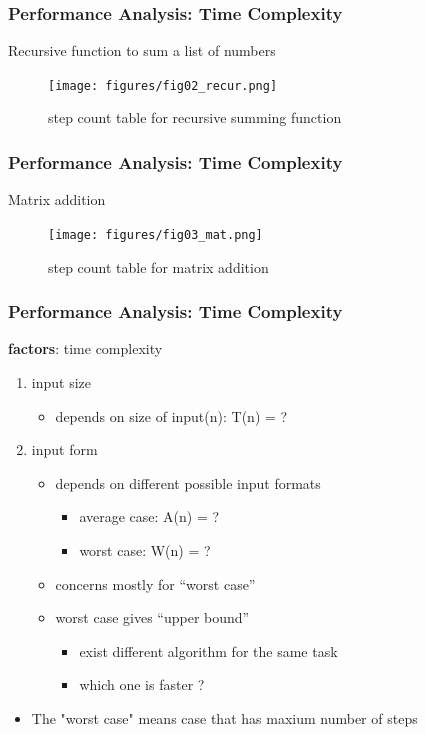 \documentclass[newPxFont,sthlmFooter,nooffset]{beamer}
\begin{document}
\begin{frame}[t]
  \frametitle{Performance Analysis: Time Complexity}
Recursive function to sum a list of numbers
  \begin{figure}[h]
    \centering
    \texttt{[image: figures/fig02\_recur.png]}
    \caption{step count table for recursive summing function}
  \end{figure}
\end{frame}

\begin{frame}[t]
  \frametitle{Performance Analysis: Time Complexity}
Matrix addition
  \begin{figure}[h]
    \centering
    \texttt{[image: figures/fig03\_mat.png]}
    \caption{step count table for matrix addition}
  \end{figure}
\end{frame}


\begin{frame}[t]
  \frametitle{Performance Analysis: Time Complexity}
\textbf{factors}: time complexity 
\begin{enumerate}
\item input size
  \begin{itemize}
  \item depends on size of input(n): T(n) = ?
  \end{itemize}

\item input form
  \begin{itemize}
  \item depends on different possible input formats
    \begin{itemize}
    \item average case: A(n) = ?
    \item worst case: W(n) = ?
    \end{itemize}

  \item concerns mostly for ``worst case''
  \item worst case gives ``upper bound''
    \begin{itemize}
    \item exist different algorithm for the same task
    \item which one is faster ?
    \end{itemize}
  \end{itemize}
\end{enumerate}
\begin{itemize}
	\item The "worst case" means case that has maxium number of steps 
\end{itemize}

\end{frame}
\end{document}

